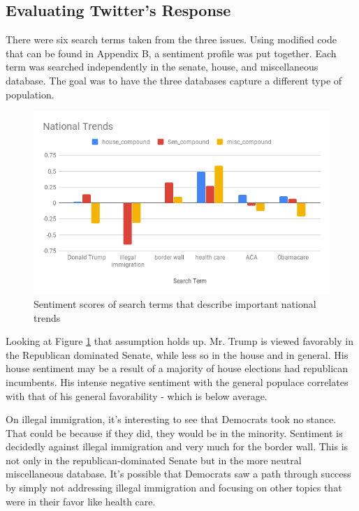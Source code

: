 \documentclass[11pt, twoside, reqno]{book}
\begin{document}
\subsection{Evaluating Twitter's Response}
\hspace{0.2in}There were six search terms taken from the three issues. Using modified code that can be found in Appendix B, a sentiment profile was put together. Each term was searched independently in the senate, house, and miscellaneous database. The goal was to have the three databases capture a different type of population. 
\begin{figure}[H]
	\includegraphics[scale=0.65]{natty_trends}	
	\caption{Sentiment scores of search terms that describe important national trends}
	\label{fig:natty_trends}
\end{figure}

Looking at Figure \ref{fig:natty_trends} that assumption holds up. Mr. Trump is viewed favorably in the Republican dominated Senate, while less so in the house and in general. His house sentiment may be a result of a majority of house elections had republican incumbents. His intense negative sentiment with the general populace correlates with that of his general favorability - which is below average. 

On illegal immigration, it's interesting to see that Democrats took no stance. That could be because if they did, they would be in the minority. Sentiment is decidedly against illegal immigration and very much for the border wall. This is not only in the republican-dominated Senate but in the more neutral miscellaneous database. It's possible that Democrats saw a path through success by simply not addressing illegal immigration and focusing on other topics that were in their favor like health care. 
\end{document}
